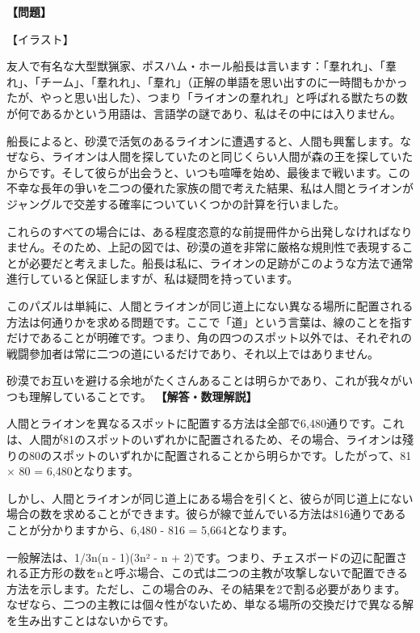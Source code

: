 \documentclass[10pt,a4paper,oneside,openany]{ltjsbook}
\begin{document}
\begin{tcolorbox}[colback=softblue,colframe=primaryblue,title=\textbf{第 318 問：ライオン狩り （原題: LION-HUNTING.）},arc=2mm,boxrule=1pt,breakable]
\textbf{【問題】}\par\vspace{0.3em}
【イラスト】

友人で有名な大型獣猟家、ポスハム・ホール船長は言います：「羣れれ」、「羣れ」、「チーム」、「羣れれ」、「羣れ」（正解の単語を思い出すのに一時間もかかったが、やっと思い出した）、つまり「ライオンの羣れれ」と呼ばれる獣たちの数が何であるかという用語は、言語学の謎であり、私はその中には入りません。

船長によると、砂漠で活気のあるライオンに遭遇すると、人間も興奮します。なぜなら、ライオンは人間を探していたのと同じくらい人間が森の王を探していたからです。そして彼らが出会うと、いつも喧嘩を始め、最後まで戦います。この不幸な長年の爭いを二つの優れた家族の間で考えた結果、私は人間とライオンがジャングルで交差する確率についていくつかの計算を行いました。

これらのすべての場合には、ある程度恣意的な前提冊件から出発しなければなりません。そのため、上記の図では、砂漠の道を非常に厳格な規則性で表現することが必要だと考えました。船長は私に、ライオンの足跡がこのような方法で通常進行していると保証しますが、私は疑問を持っています。

このパズルは単純に、人間とライオンが同じ道上にない異なる場所に配置される方法は何通りかを求める問題です。ここで「道」という言葉は、線のことを指すだけであることが明確です。つまり、角の四つのスポット以外では、それぞれの戦闘參加者は常に二つの道にいるだけであり、それ以上ではありません。

砂漠でお互いを避ける余地がたくさんあることは明らかであり、これが我々がいつも理解していることです。
\tcblower
\textbf{【解答・数理解説】}\par\vspace{0.3em}
人間とライオンを異なるスポットに配置する方法は全部で6,480通りです。これは、人間が81のスポットのいずれかに配置されるため、その場合、ライオンは殘りの80のスポットのいずれかに配置されることから明らかです。したがって、81 × 80 = 6,480となります。

しかし、人間とライオンが同じ道上にある場合を引くと、彼らが同じ道上にない場合の数を求めることができます。彼らが線で並んでいる方法は816通りであることが分かりますから、6,480 - 816 = 5,664となります。

一般解法は、1/3n(n - 1)(3n² - n + 2)です。つまり、チェスボードの辺に配置される正方形の数をnと呼ぶ場合、この式は二つの主教が攻撃しないで配置できる方法を示します。ただし、この場合のみ、その結果を2で割る必要があります。なぜなら、二つの主教には個々性がないため、単なる場所の交換だけで異なる解を生み出すことはないからです。
\end{tcolorbox}
\end{document}
